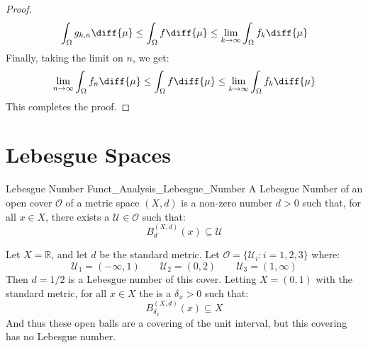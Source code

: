 \begin{proof}
\begin{equation}
                    \int_{\Omega}g_{k,n}\diff{\mu}
                    \leq\int_{\Omega}f\diff{\mu}
                    \leq\underset{k\rightarrow\infty}{\lim}
                    \int_{\Omega}f_{k}\diff{\mu}
                \end{equation}
                Finally, taking the limit on $n$, we get:
                \begin{equation}
                    \underset{n\rightarrow\infty}{\lim}
                    \int_{\Omega}f_{n}\diff{\mu}
                    \leq\int_{\Omega}f\diff{\mu}
                    \leq\underset{k\rightarrow\infty}{\lim}
                    \int_{\Omega}f_{k}\diff{\mu}
                \end{equation}
                This completes the proof.
            \end{proof}
    \section{Lebesgue Spaces}
        \begin{ldefinition}{Lebesgue Number}
              {Funct_Analysis_Lebesgue_Number}
            A Lebesgue Number of an open cover
            $\mathcal{O}$ of a metric space $(X,d)$ is
            a non-zero number $d>0$ such that, for all
            $x\in{X}$, there exists
            a $\mathcal{U}\in\mathcal{O}$ such that:
            \begin{equation}
                B_{d}^{(X,d)}(x)\subseteq\mathcal{U}
            \end{equation}
        \end{ldefinition}
        \begin{lexample}
            Let $X=\mathbb{R}$, and let $d$ be the
            standard metric. Let
            $\mathcal{O}=\{\mathcal{U}_{i}:i=1,2,3\}$ where:
            \begin{equation}
                \mathcal{U}_{1}=(-\infty,1)
                \quad\quad
                \mathcal{U}_{2}=(0,2)
                \quad\quad
                \mathcal{U}_{3}=(1,\infty)
            \end{equation}
            Then $d=1/2$ is a Lebesgue number of this cover.
            Letting $X=(0,1)$ with the standard metric, for all
            $x\in{X}$ the is a $\delta_{x}>0$ such that:
            \begin{equation}
                B_{\delta_{x}}^{(X,d)}(x)
                \subseteq{X}
            \end{equation}
            And thus these open balls are a covering of the unit
            interval, but this covering has no Lebesgue number.
        \end{lexample}
